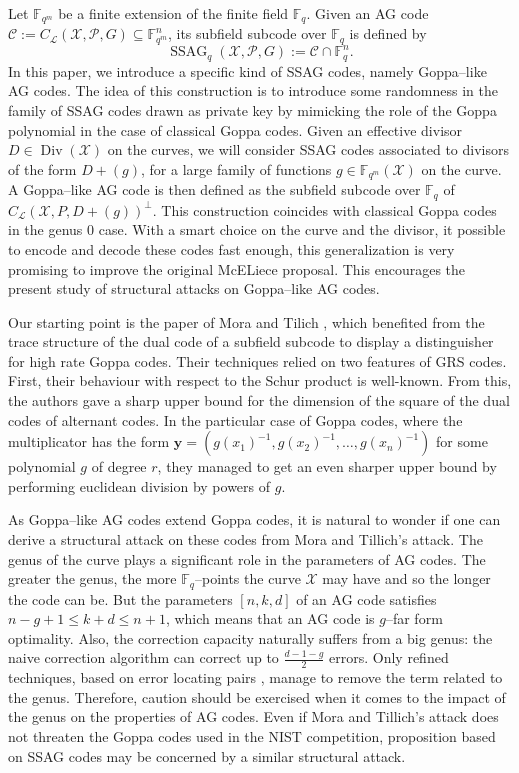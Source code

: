 \documentclass[a4paper]{article}
\theoremstyle{definition}
\theoremstyle{remark}
\newcommand{\calP}{\mathcal{P}}
\newcommand{\calL}{\mathcal{L}}
\newcommand{\calC}{\mathcal{C}}
\newcommand{\calX}{\mathcal{X}}
\newcommand{\fqm}{\mathbb{F}_{q^m}}
\newcommand{\fq}{\mathbb{F}_{q}}
\newcommand{\F}{\mathbb{F}}
\newcommand{\Div}{\operatorname{Div}}
\newcommand{\ssag}[1]{\operatorname{SSAG}_{q}\left(#1\right)}
\begin{document}
\medskip

Let $\fqm$ be a finite extension of the finite field $\fq$. Given an AG code $\calC :=C_{\calL}(\calX,\calP,G) \subseteq \fqm^n$, its subfield subcode over $\fq$ is defined by 
$$\ssag{\calX,\calP,G} := \calC \cap \fq^n.$$  
In this paper, we introduce a specific kind of SSAG codes, namely Goppa--like AG codes. The idea of this construction is to introduce  some randomness in the family of SSAG codes drawn as private key by mimicking the role of the Goppa polynomial in the case of classical Goppa codes. Given an effective divisor $D\in \Div(\calX)$ on the curves, we will consider SSAG codes associated to  divisors of the form $D+(g)$, for a large family of functions $g \in \fqm(\calX)$ on the curve. A Goppa--like AG code is then defined as the subfield subcode over $\fq$ of $C_{\calL}(\calX,P,D+(g))^{\perp}$. This construction coincides with classical Goppa codes in the genus 0 case.%
With a smart choice on the curve and the divisor, it possible to encode and decode these codes fast enough, this generalization is very promising to improve the original McELiece proposal. This encourages the present study of structural attacks on Goppa--like AG codes. 

Our starting point is the paper of Mora and Tilich \cite{MT21}, which benefited from the trace structure of the dual code of a subfield subcode to display a distinguisher for high rate Goppa codes. Their techniques relied on two features of GRS codes. First, their behaviour with respect to the Schur product is well-known. From this, the authors gave a sharp upper bound for the dimension of the square of the dual codes of alternant codes. In the particular case of Goppa codes, where the multiplicator has the form $\mathbf{y}=(g(x_1)^{-1},g(x_2)^{-1},\dots,g(x_n)^{-1})$ for some polynomial $g$ of degree $r$, they managed to get an even sharper upper bound by performing euclidean division by powers of $g$.

As Goppa--like AG codes extend Goppa codes, it is natural to wonder if one can derive a structural attack on these codes from Mora and Tillich's attack. The genus of the curve plays a significant role in the parameters of AG codes. The greater the genus, the more $\F_q$--points the curve $\calX$ may have and so the longer the code can be. But the parameters $[n,k,d]$ of an AG code satisfies $n-g+1 \leq k+d \leq n+1$, which means that an AG code is $g$--far form optimality. Also, the correction capacity naturally suffers from a big genus: the naive correction algorithm can correct up to $\frac{d-1-g}{2}$ errors. Only refined techniques, based on error locating pairs \cite{CP20}, manage to remove the term related to the genus. Therefore, caution should be exercised when it comes to the impact of the genus on the properties of AG codes.
Even if Mora and Tillich's attack does not threaten the Goppa codes used in the NIST competition, proposition based on SSAG codes may be concerned by a similar structural attack. 
\end{document}
